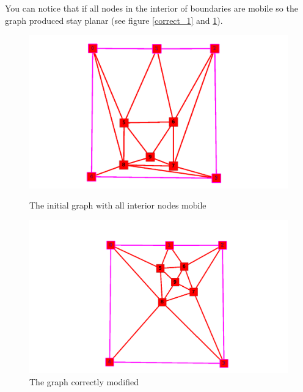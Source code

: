 
You can notice that if all nodes in the interior of boundaries are mobile
so the graph produced stay planar (see figure \ref{correct_1} and \ref{correct_2}).

\begin{figure}[!h]
  \begin{minipage}[!h]{.5\linewidth}
    \includegraphics[scale=0.27]{snapshots/constate_mobil_init.png}
    \caption{The initial graph with all interior nodes mobile}
    \label{correct_1}
  \end{minipage}
  \begin{minipage}[!h]{.55\linewidth}
    \centering
    \includegraphics[scale=0.29]{snapshots/constate_nikel.png}
    \caption{The graph correctly modified}
    \label{correct_2}
  \end{minipage} \hfill
\end{figure}
